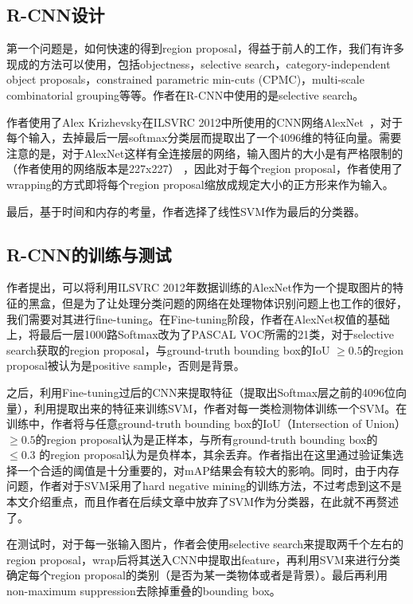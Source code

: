 \documentclass[10pt,twocolumn,letterpaper]{article}
\begin{document}
\subsection{R-CNN设计}
第一个问题是，如何快速的得到region proposal，得益于前人的工作，我们有许多现成的方法可以使用，包括objectness，selective search，category-independent object proposals，constrained parametric min-cuts (CPMC)，multi-scale combinatorial grouping等等。作者在R-CNN中使用的是selective search。

作者使用了Alex Krizhevsky在ILSVRC 2012中所使用的CNN网络AlexNet~\cite{krizhevsky2012imagenet}，对于每个输入，去掉最后一层softmax分类层而提取出了一个4096维的特征向量。需要注意的是，对于AlexNet这样有全连接层的网络，输入图片的大小是有严格限制的（作者使用的网络版本是227x227） ，因此对于每个region proposal，作者使用了wrapping的方式即将每个region proposal缩放成规定大小的正方形来作为输入。

最后，基于时间和内存的考量，作者选择了线性SVM作为最后的分类器。

\subsection{R-CNN的训练与测试}

作者提出，可以将利用ILSVRC 2012年数据训练的AlexNet作为一个提取图片的特征的黑盒，但是为了让处理分类问题的网络在处理物体识别问题上也工作的很好，我们需要对其进行fine-tuning。在Fine-tuning阶段，作者在AlexNet权值的基础上，将最后一层1000路Softmax改为了PASCAL VOC所需的21类，对于selective search获取的region proposal，与ground-truth bounding box的IoU $\geqslant 0.5$的region proposal被认为是positive sample，否则是背景。

之后，利用Fine-tuning过后的CNN来提取特征（提取出Softmax层之前的4096位向量），利用提取出来的特征来训练SVM，作者对每一类检测物体训练一个SVM。在训练中，作者将与任意ground-truth bounding box的IoU（Intersection of Union）$\geqslant 0.5$的region proposal认为是正样本，与所有ground-truth bounding box的 $\leqslant 0.3$ 的region proposal认为是负样本，其余丢弃。作者指出在这里通过验证集选择一个合适的阈值是十分重要的，对mAP结果会有较大的影响。同时，由于内存问题，作者对于SVM采用了hard negative mining的训练方法，不过考虑到这不是本文介绍重点，而且作者在后续文章中放弃了SVM作为分类器，在此就不再赘述了。

在测试时，对于每一张输入图片，作者会使用selective search来提取两千个左右的region proposal，wrap后将其送入CNN中提取出feature，再利用SVM来进行分类确定每个region proposal的类别（是否为某一类物体或者是背景）。最后再利用non-maximum suppression去除掉重叠的bounding box。
\end{document}
